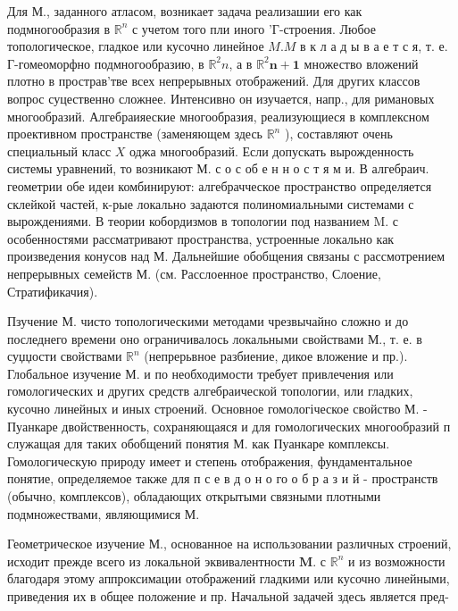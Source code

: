 \documentclass[10pt]{article}
\begin{document}
Для М., заданного атласом, возникает задача реализашии его как подмногообразия в $\mathbb{R}^{n}$ с учетом того пли иного 'Г-строения. Любое топологическое, гладкое или кусочно линейное $M . M$ в к л а д ы в а е т с я, т. е. Г-гомеоморфно подмногообразию, в $\mathbb{R}^{2} n$, а в $\mathbb{R}^{2} \boldsymbol{n}+\mathbf{1}$ множество вложений плотно в прострав'тве всех непрерывных отображений. Для других классов вопрос суцественно сложнее. Интенсивно он изучается, напр., для римановых многообразий. Алгебраияеские многообразия, реализующиеся в комплексном проективном пространстве (заменяющем здесь $\mathbb{R}^{n}$ ), составляют очень специальный класс $X$ оджа многообразий. Если допускать вырожденность системы уравнений, то возникают М. с о с об е н н о с т я м и. В алгебраич. геометрии обе идеи комбинируют: алгебрачческое пространство определяется склейкой частей, к-рые локально задаются полиномиальными системами с вырождениями. В теории кобордизмов в топологии под названием M. с особенностями рассматривают пространства, устроенные локально как произведения конусов над М. Дальнейшие обобщения связаны с рассмотрением непрерывных семейств М. (см. Расслоенное пространство, Слоение, Стратификачия).



Пзучение М. чисто топологическими методами чрезвычайно сложно и до последнего времени оно ограничивалось локальными свойствами М., т. е. в суџџости свойствами $\mathbb{R}^{n}$ (непрерьвное разбиение, дикое вложение и пр.). Глобальное изучение М. и по необходимости требует привлечения или гомологических и других средств алгебраической топологии, или гладких, кусочно линейных и иных строений. Основное гомологіческое свойство М. - Пуанкаре двойственность, сохраняющаяся и для гомологических многообразий п служащая для таких обобщений понятия М. как Пуанкаре комплексы. Гомологическую природу имеет и степень отображения, фундаментальное понятие, определяемое также для п с е в д о н о го о б р а з и й - пространств (обычно, комплексов), обладающих открытыми связными плотными подмножествами, являющимися М.



Геометрическое изучение М., основанное на использовании различных строений, исходит прежде всего из локальной эквивалентности $\mathbf{M}$. с $\mathbb{R}^{n}$ и из возможности благодаря этому аппроксимации отображений гладкими или кусочно линейными, приведения их в общее положение и пр. Начальной задачей здесь является пред-
\end{document}
